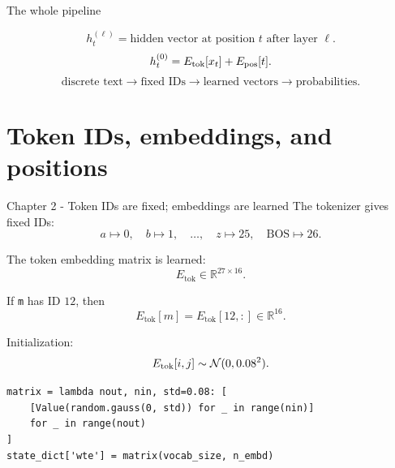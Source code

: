 \documentclass[
  xcolor={svgnames,dvipsnames},
  hyperref={pagebackref,bookmarks},
  aspectratio=169,
  11pt
]{beamer}
\begin{document}
\begin{frame}{The whole pipeline}
\centering
{}

\vspace{0.45cm}
\[
h_t^{(\ell)}=\text{hidden vector at position }t\text{ after layer }\ell.
\]
\[
h_t^{(0)}=E_{\rm tok}[x_t]+E_{\rm pos}[t].
\]
\vspace{-0.1cm}
\[
\text{discrete text}\longrightarrow \text{fixed IDs}\longrightarrow \text{learned vectors}\longrightarrow \text{probabilities}.
\]
\end{frame}

\section{Token IDs, embeddings, and positions}
\begin{frame}[fragile]{Chapter 2 - Token IDs are fixed; embeddings are learned}
The tokenizer gives fixed IDs:
\[
a\mapsto 0,\quad b\mapsto 1,\quad\ldots,\quad z\mapsto 25,\quad \mathrm{BOS}\mapsto 26.
\]

The token embedding matrix is learned:
\[
E_{\mathrm{tok}}\in\mathbb R^{27\times 16}.
\]

If \texttt{m} has ID $12$, then
\[
E_{\mathrm{tok}}[m]=E_{\mathrm{tok}}[12,:]\in\mathbb R^{16}.
\]

Initialization:
\[
E_{\rm tok}[i,j]\sim\mathcal N(0,0.08^2).
\]
\begin{center}
\begin{minipage}{0.84\linewidth}
\begin{lstlisting}
matrix = lambda nout, nin, std=0.08: [
    [Value(random.gauss(0, std)) for _ in range(nin)]
    for _ in range(nout)
]
state_dict['wte'] = matrix(vocab_size, n_embd)
\end{lstlisting}
\end{minipage}
\end{center}
\end{frame}
\end{document}
